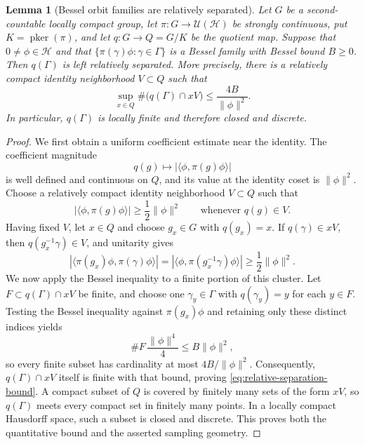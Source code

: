 \documentclass[reqno]{amsart}
\numberwithin{equation}{section}
\newtheorem{lemma}[theorem]{Lemma}
\theoremstyle{definition}
\theoremstyle{remark}
\newcommand{\cH}{\mathcal H}
\newcommand{\U}{\mathcal U}
\newcommand{\pker}{\operatorname{pker}}
\begin{document}
\begin{lemma}[Bessel orbit families are relatively separated]
\label{lem:bessel-relative-separation}
Let $G$ be a second-countable locally compact group, let
$\pi:G\to\U(\cH)$ be strongly continuous, put $K=\pker(\pi)$, and let
$q:G\to Q=G/K$ be the quotient map.  Suppose that $0\neq\phi\in\cH$ and
that $\{\pi(\gamma)\phi:\gamma\in\Gamma\}$ is a Bessel family with
Bessel bound $B\geq0$.  Then $q(\Gamma)$ is left relatively separated.  More precisely,
there is a relatively compact identity neighborhood $V\subset Q$ such that
\begin{equation}\label{eq:relative-separation-bound}
  \sup_{x\in Q}\#\bigl(q(\Gamma)\cap xV\bigr)
  \leq \frac{4B}{\|\phi\|^2}.
\end{equation}
In particular, $q(\Gamma)$ is locally finite and therefore closed and
discrete.
\end{lemma}

\begin{proof}
We first obtain a uniform coefficient estimate near the identity.  The
coefficient magnitude
\[
  q(g)\longmapsto |\langle\phi,\pi(g)\phi\rangle|
\]
is well defined and continuous on $Q$, and its value at the identity coset
is $\|\phi\|^2$.  Choose a relatively compact identity neighborhood
$V\subset Q$ such that
\begin{equation}\label{eq:coefficient-near-identity}
 |\langle\phi,\pi(g)\phi\rangle|
 \geq \frac12\|\phi\|^2
 \qquad\text{whenever }q(g)\in V.
\end{equation}
Having fixed $V$, let $x\in Q$ and choose $g_x\in G$ with $q(g_x)=x$.  If
$q(\gamma)\in xV$, then $q(g_x^{-1}\gamma)\in V$, and unitarity gives
\[
 |\langle\pi(g_x)\phi,\pi(\gamma)\phi\rangle|
 =|\langle\phi,\pi(g_x^{-1}\gamma)\phi\rangle|
 \geq \frac12\|\phi\|^2.
\]
We now apply the Bessel inequality to a finite portion of this cluster.  Let
$F\subset q(\Gamma)\cap xV$ be finite, and choose one
$\gamma_y\in\Gamma$ with $q(\gamma_y)=y$ for each $y\in F$.  Testing the
Bessel inequality against $\pi(g_x)\phi$ and retaining only these distinct
indices yields
\[
 \#F\,\frac{\|\phi\|^4}{4}
 \leq B\|\phi\|^2,
\]
so every finite subset has cardinality at most $4B/\|\phi\|^2$.  Consequently,
$q(\Gamma)\cap xV$ itself is finite with that bound, proving
\eqref{eq:relative-separation-bound}.  A compact subset of $Q$
is covered by finitely many sets of the form $xV$, so $q(\Gamma)$ meets every
compact set in finitely many points.  In a locally compact Hausdorff space,
such a subset is closed and discrete.  This proves both the quantitative
bound and the asserted sampling geometry.
\end{proof}
\end{document}
